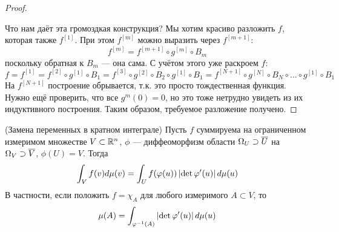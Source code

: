 \begin{proof}
\begin{itemize}
	\end{itemize}
	Что нам даёт эта громоздкая конструкция? Мы хотим красиво разложить $f$, которая также $f^{[1]}$. При этом $f^{[m]}$ можно выразить через $f^{[m+1]}$:
	\[
		f^{[m]} = f^{[m+1]} \circ g^{[m]} \circ B_m
	\]
	поскольку обратная к $B_m$ --- она сама. С учётом этого уже раскроем $f$:
	\[
		f = f^{[1]} = f^{[2]} \circ g^{[1]} \circ B_1 = f^{[3]} \circ g^{[2]} \circ B_2 \circ g^{[1]} \circ B_1 = f^{[N+1]} \circ g^{[N]} \circ B_N \circ \hdots \circ g^{[1]} \circ B_1
	\]
	На $f^{[N+1]}$ построение обрывается, т.к. это просто тождественная функция. Нужно ещё проверить, что все $g^{m}(0) = 0$, но это тоже нетрудно увидеть из их индуктивного построения.
	Таким образом, требуемое разложение получено.
\end{proof}

\begin{theorem} (Замена переменных в кратном интеграле)
	Пусть $f$ суммируема на ограниченном измеримом множестве $V \subset \mathbb{R}^n$, $\phi$ --- диффеоморфизм области $\Omega_U \supset \overline{U}$ на $\Omega_V \supset \overline{V}$, $\phi(U) = V$. Тогда
	\[
		\int_V f(v) d\mu(v) = \int_U f(\varphi(u)) \left|\det{\ensuremath{\varphi}'(u)}\right| d\mu(u)
	\]
	В частности, если положить $f = \chi_A$ для любого измеримого $A \subset V$, то
	\[
		\mu(A) = \int_{\varphi^{-1}(A)} \left|\det{\ensuremath{\varphi}'(u)}\right| d\mu(u)
	\]
\end{theorem}

